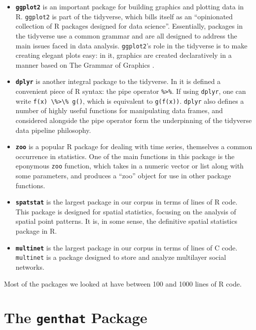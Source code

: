 \documentclass[acmsmall,10pt,review,anonymous]{acmart}\settopmatter{printfolios=true,printccs=false,printacmref=false}
\newcommand{\code}[1]{\lstinline|#1|\xspace}
\begin{document}
\begin{itemize}

	\item \textbf{\texttt{ggplot2}} is an important package for building graphics and plotting data in R.
	{\tt ggplot2} is part of the tidyverse, which bills itself as an ``opinionated collection of R packages designed for data science''.
	Essentially, packages in the tidyverse use a common grammar and are all designed to address the main issues faced in data analysis.
	{\tt ggplot2}'s role in the tidyverse is to make creating elegant plots easy: in it, graphics are created declaratively in a manner based on The Grammar of Graphics .

	\item \textbf{\texttt{dplyr}} is another integral package to the tidyverse.
	In it is defined a convenient piece of R syntax: the pipe operator {\tt \%>\%}.
	If using {\tt dplyr}, one can write \code{f(x) \%>\% g()}, which is equivalent to \code{g(f(x))}.
	{\tt dplyr} also defines a number of highly useful functions for manipulating data frames, and considered alongside the pipe operator form the underpinning of the tidyverse data pipeline philosophy.

	\item \textbf{\texttt{zoo}} is a popular R package for dealing with time series, themselves a common occurrence in statistics.
	One of the main functions in this package is the eponymous {\tt zoo} function, which takes in a numeric vector or list along with some parameters, and produces a ``zoo'' object for use in other package functions.

	\item \textbf{\texttt{spatstat}} is the largest package in our corpus in terms of lines of R code.
	This package is designed for spatial statistics, focusing on the analysis of spatial point patterns.
	It is, in some sense, the definitive spatial statistics package in R.
	
	\item \textbf{\texttt{multinet}} is the largest package in our corpus in terms of lines of C code.
	{\tt multinet} is a package designed to store and analyze multilayer social networks.

\end{itemize}

Most of the packages we looked at have between 100 and 1000 lines of R code.

%
%
%
%
\section{The \texttt{genthat} Package}
\label{sec:genthat}
\end{document}
